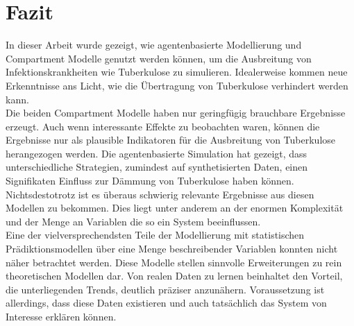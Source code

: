 \documentclass[paper=a4, fontsize=11pt, ngerman, abstract=on]{scrartcl}
\numberwithin{equation}{section} %
\numberwithin{figure}{section} %
\numberwithin{table}{section} %
\begin{document}
\newpage

\section{Fazit}

In dieser Arbeit wurde gezeigt, wie agentenbasierte Modellierung und Compartment Modelle genutzt werden können, um die Ausbreitung von Infektionskrankheiten wie Tuberkulose zu simulieren. Idealerweise kommen neue Erkenntnisse ans Licht, wie die Übertragung von Tuberkulose verhindert werden kann. \\

Die beiden Compartment Modelle haben nur geringfügig brauchbare Ergebnisse erzeugt. Auch wenn interessante Effekte zu beobachten waren, können die Ergebnisse nur als plausible Indikatoren für die Ausbreitung von Tuberkulose herangezogen werden. Die agentenbasierte Simulation hat gezeigt, dass unterschiedliche Strategien, zumindest auf synthetisierten Daten, einen Signifikaten Einfluss zur Dämmung von Tuberkulose haben können. Nichtsdestotrotz ist es überaus schwierig relevante Ergebnisse aus diesen Modellen zu bekommen. Dies liegt unter anderem an der enormen Komplexität und der Menge an Variablen die so ein System beeinflussen. \\

Eine der vielversprechendsten Teile der Modellierung mit statistischen Prädiktionsmodellen über eine Menge beschreibender Variablen konnten nicht näher betrachtet werden. Diese Modelle stellen sinnvolle Erweiterungen zu rein theoretischen Modellen dar. Von realen Daten zu lernen beinhaltet den Vorteil, die unterliegenden Trends, deutlich präziser anzunähern. Voraussetzung ist allerdings, dass diese Daten existieren und auch tatsächlich das System von Interesse erklären können.

\newpage



\end{document}
